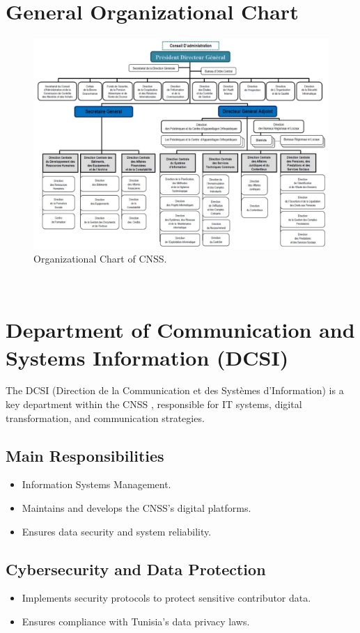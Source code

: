 \section{General Organizational Chart}
\begin{figure}[htbp]
    \centering
    \includegraphics[width=1\textwidth]{figures/orga cnss.jpg} 
    \caption{Organizational Chart of CNSS.}
\end{figure} \ 

\section{Department of Communication and Systems Information (DCSI)}  
The DCSI (Direction de la Communication et des Systèmes d'Information) is a key department within the CNSS , responsible for IT systems, digital transformation, and communication strategies.

\subsection{Main Responsibilities}
\begin{itemize}
    \item Information Systems Management.
    \item Maintains and develops the CNSS's digital platforms.
    \item Ensures data security and system reliability.
\end{itemize}
\subsection{Cybersecurity and Data Protection}
\begin{itemize}
    \item Implements security protocols to protect sensitive contributor data.
    \item Ensures compliance with Tunisia’s data privacy laws.
\end{itemize}

